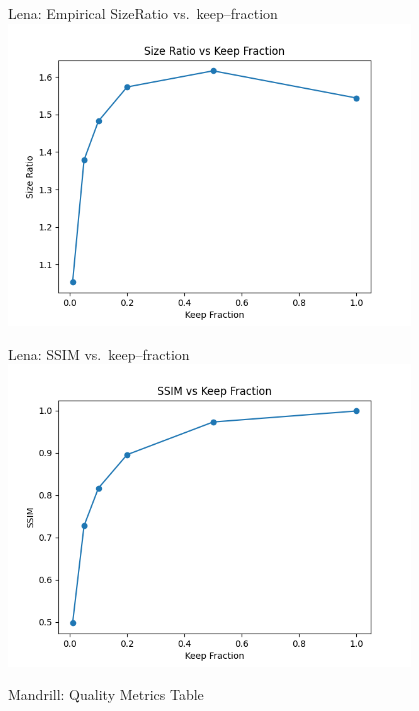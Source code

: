 \documentclass[12pt]{beamer}
\begin{document}
\begin{frame}{Lena: Empirical SizeRatio vs.\ keep–fraction}
  \centering
  \includegraphics[width=0.8\textwidth]{size_ratio_vs_keep_Lena.png}
\end{frame}

\begin{frame}{Lena: SSIM vs.\ keep–fraction}
  \centering
  \includegraphics[width=0.8\textwidth]{ssim_vs_keep_Lena.png}
\end{frame}


\begin{frame}[fragile]{Mandrill: Quality Metrics Table}
  \scriptsize
  \centering
\end{frame}
\end{document}
